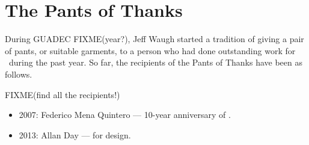 \chapter{The Pants of Thanks}

During \gls{GUADEC} FIXME(year?), Jeff Waugh started a tradition of giving a
pair of pants, or suitable garments, to a person who had done
outstanding work for \GNOME\ during the past year.  So far, the
recipients of the Pants of Thanks have been as follows.

FIXME(find all the recipients!)

\begin{itemize}

\item{2007: Federico Mena Quintero --- 10-year anniversary of \GNOME.}

\item{2013: Allan Day --- for design.}

\end{itemize}
